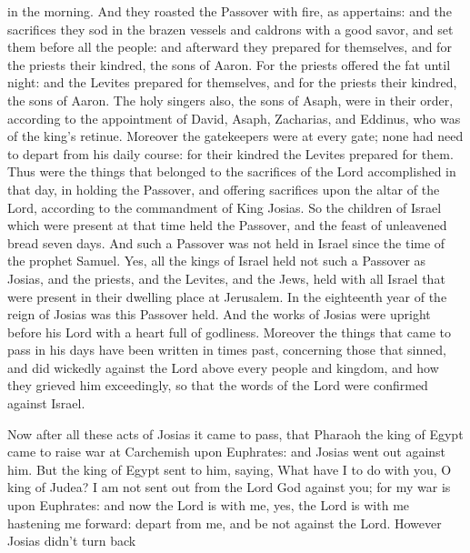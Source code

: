 {{} in the morning.
And they roasted the Passover with fire, as appertains: and the sacrifices they sod in the brazen vessels and caldrons with a good savor,
and set them before all the people: and afterward they prepared for themselves, and for the priests their kindred, the sons of Aaron.
For the priests offered the fat until night: and the Levites prepared for themselves, and for the priests their kindred, the sons of Aaron.
The holy singers also, the sons of Asaph, were in their order, according to the appointment of David,
{} Asaph, Zacharias, and Eddinus, who
 was of the king’s retinue.
Moreover the gatekeepers were at every gate; none had need to depart from his daily course: for their kindred the Levites prepared for them.
Thus were the things that belonged to the sacrifices of the Lord accomplished in that day, in holding the Passover,
and offering sacrifices upon the altar of the Lord, according to the commandment of King Josias.
So the children of Israel which were present at that time held the Passover, and the feast of unleavened bread seven days.
And such a Passover was not held in Israel since the time of the prophet Samuel.
Yes, all the kings of Israel held not such a Passover as Josias, and the priests, and the Levites, and the Jews, held with all Israel that were present in their dwelling place at Jerusalem.
In the eighteenth year of the reign of Josias was this Passover held.
And the works of Josias were upright before his Lord with a heart full of godliness.
Moreover the things that came to pass in his days have been written in times past, concerning those that sinned, and did wickedly against the Lord above every people and kingdom, and how they grieved him
 exceedingly, so that the words of the Lord were confirmed against Israel.
\par }{\PP {} Now after all these acts of Josias it came to pass, that Pharaoh the king of Egypt came to raise war at Carchemish upon Euphrates: and Josias went out against him.
But the king of Egypt sent to him, saying, What have I to do with you, O king of Judea?
I am not sent out from the Lord God against you; for my war is upon Euphrates: and now the Lord is with me, yes, the Lord is with me hastening me forward: depart from me, and be not against the Lord.
However Josias didn’t turn back
}
